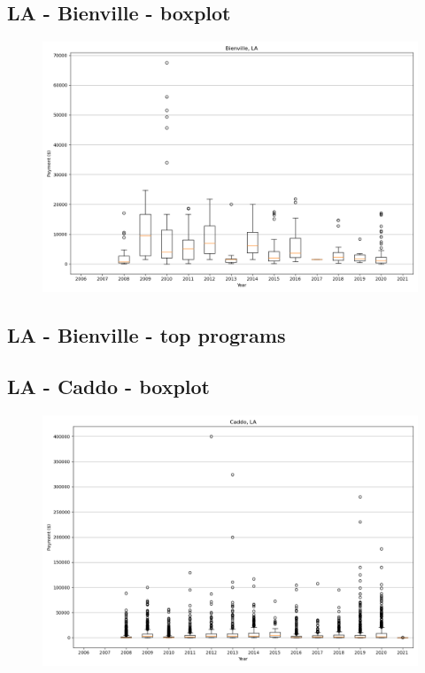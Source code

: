 \subsection*{LA - Bienville - boxplot}
\begin{figure}[h]
\centering
\includegraphics[width=7in]{../output/boxplots/counties/Bienville-LA_boxplot.png}
\end{figure}


\subsection*{LA - Bienville - top programs}

\newpage
\subsection*{LA - Caddo - boxplot}
\begin{figure}[h]
\centering
\includegraphics[width=7in]{../output/boxplots/counties/Caddo-LA_boxplot.png}
\end{figure}


